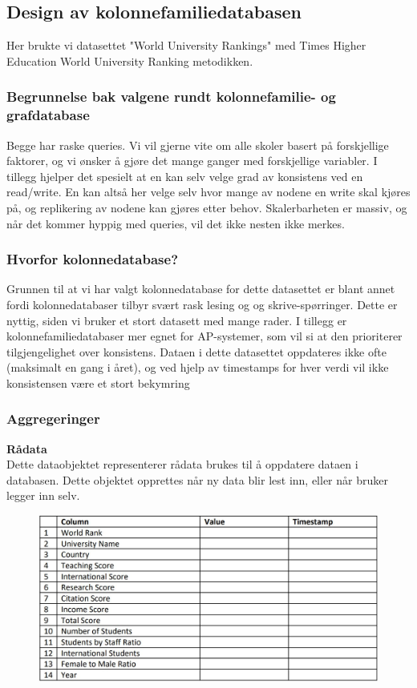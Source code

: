 \subsection{Design av kolonnefamiliedatabasen}
Her brukte vi datasettet "World University Rankings" med Times Higher Education World University Ranking metodikken.

\subsubsection{Begrunnelse bak valgene rundt kolonnefamilie- og grafdatabase}
Begge har raske queries. Vi vil gjerne vite om alle skoler basert på forskjellige faktorer, og vi ønsker å gjøre det  mange ganger med forskjellige variabler. I tillegg hjelper det spesielt at en kan selv velge grad av konsistens ved en read/write. En kan altså her velge selv hvor mange av nodene en write skal kjøres på, og replikering av nodene kan gjøres etter behov. Skalerbarheten er massiv, og når det kommer hyppig med queries, vil det ikke nesten ikke merkes.

\subsubsection{Hvorfor kolonnedatabase?}
Grunnen til at vi har valgt kolonnedatabase for dette datasettet er blant annet fordi 
kolonnedatabaser tilbyr svært rask lesing og og skrive-spørringer. Dette er nyttig, siden vi bruker et 
stort datasett med mange rader. I tillegg er kolonnefamiliedatabaser mer egnet for AP-systemer, 
som vil si at den prioriterer tilgjengelighet over konsistens. Dataen i dette datasettet oppdateres ikke 
ofte (maksimalt en gang i året), og ved hjelp av timestamps for hver verdi vil ikke konsistensen være 
et stort bekymring

\subsubsection{Aggregeringer}
\textbf{Rådata}\\
Dette dataobjektet representerer rådata brukes til å oppdatere dataen i databasen. Dette objektet opprettes når ny data blir lest inn, eller når bruker legger inn selv.

\FigureCounter
\begin{figure}[H]
  \includegraphics[width=\textwidth]{images/milepael4/rawObject.JPG}
\end{figure}

